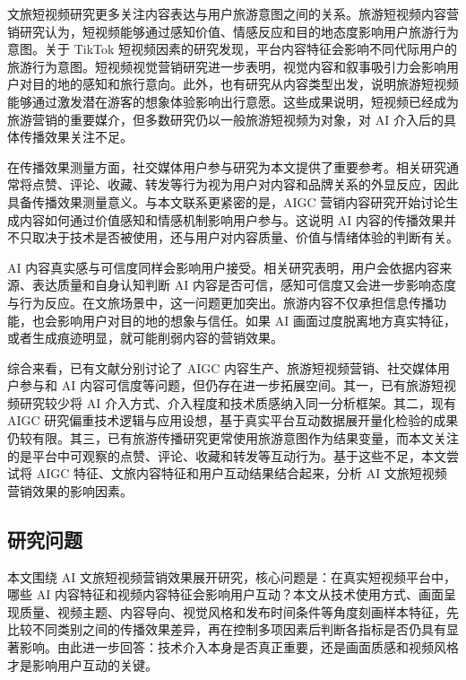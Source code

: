 文旅短视频研究更多关注内容表达与用户旅游意图之间的关系。旅游短视频内容营销研究认为，短视频能够通过感知价值、情感反应和目的地态度影响用户旅游行为意图\cite{lit04}。关于 TikTok 短视频因素的研究发现，平台内容特征会影响不同代际用户的旅游行为意图\cite{lit05}。短视频视觉营销研究进一步表明，视觉内容和叙事吸引力会影响用户对目的地的感知和旅行意向\cite{lit06}。此外，也有研究从内容类型出发，说明旅游短视频能够通过激发潜在游客的想象体验影响出行意愿\cite{lit22}。这些成果说明，短视频已经成为旅游营销的重要媒介，但多数研究仍以一般旅游短视频为对象，对 AI 介入后的具体传播效果关注不足。

在传播效果测量方面，社交媒体用户参与研究为本文提供了重要参考。相关研究通常将点赞、评论、收藏、转发等行为视为用户对内容和品牌关系的外显反应，因此具备传播效果测量意义\cite{lit11}。与本文联系更紧密的是，AIGC 营销内容研究开始讨论生成内容如何通过价值感知和情感机制影响用户参与\cite{lit18}。这说明 AI 内容的传播效果并不只取决于技术是否被使用，还与用户对内容质量、价值与情绪体验的判断有关。

AI 内容真实感与可信度同样会影响用户接受。相关研究表明，用户会依据内容来源、表达质量和自身认知判断 AI 内容是否可信，感知可信度又会进一步影响态度与行为反应\cite{lit14}。在文旅场景中，这一问题更加突出。旅游内容不仅承担信息传播功能，也会影响用户对目的地的想象与信任。如果 AI 画面过度脱离地方真实特征，或者生成痕迹明显，就可能削弱内容的营销效果。

综合来看，已有文献分别讨论了 AIGC 内容生产、旅游短视频营销、社交媒体用户参与和 AI 内容可信度等问题，但仍存在进一步拓展空间。其一，已有旅游短视频研究较少将 AI 介入方式、介入程度和技术质感纳入同一分析框架。其二，现有 AIGC 研究偏重技术逻辑与应用设想，基于真实平台互动数据展开量化检验的成果仍较有限。其三，已有旅游传播研究更常使用旅游意图作为结果变量，而本文关注的是平台中可观察的点赞、评论、收藏和转发等互动行为。基于这些不足，本文尝试将 AIGC 特征、文旅内容特征和用户互动结果结合起来，分析 AI 文旅短视频营销效果的影响因素。

\subsection{研究问题}

本文围绕 AI 文旅短视频营销效果展开研究，核心问题是：在真实短视频平台中，哪些 AI 内容特征和视频内容特征会影响用户互动？本文从技术使用方式、画面呈现质量、视频主题、内容导向、视觉风格和发布时间条件等角度刻画样本特征，先比较不同类别之间的传播效果差异，再在控制多项因素后判断各指标是否仍具有显著影响。由此进一步回答：技术介入本身是否真正重要，还是画面质感和视频风格才是影响用户互动的关键。

